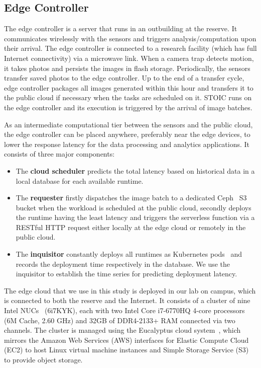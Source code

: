 \subsection{Edge Controller} 

The edge controller is a server that runs in an
outbuilding at the reserve. It communicates wirelessly with the sensors and
triggers analysis/computation upon their arrival. The edge controller is
connected to a research facility (which has full Internet connectivity) 
via a microwave link. When a camera trap detects
motion, it takes photos and persists the images in flash storage.
Periodically, the sensors transfer saved photos to the edge controller. Up to
the end of a transfer cycle, edge controller packages all images generated
within this hour and transfers it to the public cloud if necessary when the
tasks are scheduled on it. STOIC runs on the edge controller and its execution
is triggered by the arrival of image batches. 

As an intermediate computational tier between the sensors and the public
cloud, the edge controller can be placed anywhere, preferably near the edge
devices, to lower the response latency for the data processing and analytics
applications. It consists of three major components: 
\begin{itemize}
\item The \textbf{cloud
scheduler} predicts the total latency based on historical data in a local
database for each available runtime. 
\item The \textbf{requester} firstly
dispatches the image batch to a dedicated Ceph~\cite{ref:ceph} S3 bucket when
the workload is scheduled at the public cloud, secondly deploys the runtime
having the least latency and triggers the  serverless function via a
RESTful HTTP request either locally at the edge cloud or remotely in the
public cloud. 
\item The \textbf{inquisitor} constantly deploys all runtimes as
Kubernetes pods~\cite{ref:pods} and records the deployment time respectively
in the database. We use the inquisitor to establish the time series for
predicting deployment latency.
\end{itemize}

The edge cloud that we use in this study is deployed in our lab on campus,
which is connected to both the reserve and the Internet. It consists of a
cluster of nine Intel NUCs~\cite{ref:nucs} (6i7KYK), each with two Intel Core
i7-6770HQ 4-core processors (6M Cache, 2.60 GHz) and 32GB of DDR4-2133+ RAM
connected via two channels. The cluster is managed using the Eucalyptus cloud
system~\cite{ref:euca}, which mirrors the Amazon Web Services (AWS) interfaces
for Elastic Compute Cloud (EC2) to host Linux virtual machine instances and
Simple Storage Service (S3) to provide object storage.
 
